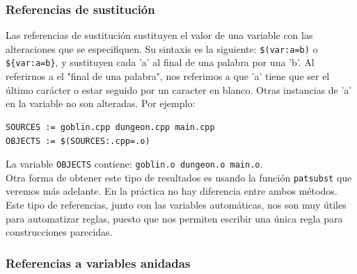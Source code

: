 \documentclass[11pt,twoside,titlepage,a4paper]{article}
\theoremstyle{definition}
\theoremstyle{plain_rojo}
\theoremstyle{remark}
\begin{document}
\subsubsection{Referencias de sustitución}

Las referencias de sustitución sustituyen el valor de una variable con las 
alteraciones que se especifiquen. Su sintaxis es la siguiente: 
\texttt{\$(var:a=b)} o \texttt{\$\{var:a=b\}}, y sustituyen cada 'a' al final
de una palabra por una 'b'. Al referirnos a el "final de una palabra", nos 
referimos a que 'a' tiene que ser el último carácter o estar seguido por un 
caracter en blanco. Otras instancias de 'a' en la variable no son alteradas. 
Por ejemplo:
\bigskip
\begin{lstlisting}
SOURCES := goblin.cpp dungeon.cpp main.cpp
OBJECTS := $(SOURCES:.cpp=.o)
\end{lstlisting}
\bigskip
La variable \texttt{OBJECTS} contiene: \texttt{goblin.o dungeon.o main.o}.
\\

Otra forma de obtener este tipo de resultados es usando la función 
\texttt{patsubst} que veremos más adelante. En la práctica no hay diferencia
entre ambos métodos.
\\

Este tipo de referencias, junto con las variables automáticas, nos son muy 
útiles para automatizar reglas, puesto que nos permiten escribir una única 
regla para construcciones parecidas.

\subsubsection{Referencias a variables anidadas}
\end{document}

